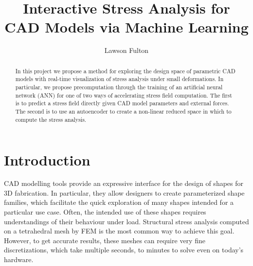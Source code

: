 \documentclass[acmtog, authorversion]{acmart}
\begin{document}
\title{Interactive Stress Analysis for CAD Models
	via Machine Learning} 

\author{Lawson Fulton}


\renewcommand\shortauthors{Fulton}

\begin{abstract}

In this project we propose a method for exploring the design space of parametric CAD models with real-time visualization of stress analysis under small deformations. In particular, we propose precomputation through the training of an artificial neural network (ANN) for one of two ways of accelerating stress field computation. The first is to predict a stress field directly given CAD model parameters and external forces. The second is to use an autoencoder to create a non-linear reduced space in which to compute the stress analysis.

\end{abstract}


%
%





\maketitle

\section{Introduction}
CAD modelling tools provide an expressive interface for the design of shapes for 3D fabrication. In particular, they allow designers to create parameterized shape families, which facilitate the quick exploration of many shapes intended for a particular use case. Often, the intended use of these shapes requires understandings of their behaviour under load. Structural stress analysis computed on a tetrahedral mesh by FEM is the most common way to achieve this goal. However, to get accurate results, these meshes can require very fine discretizations, which take multiple seconds, to minutes to solve even on today's hardware.
\end{document}

